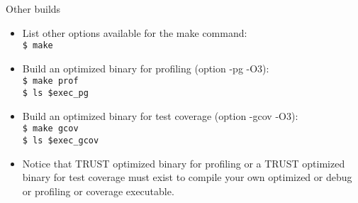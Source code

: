 \documentclass[10pt, hyperref={unicode=true,pdfusetitle, bookmarks=true,bookmarksnumbered=false,bookmarksopen=false, breaklinks=false,pdfborder={0 0 1},backref=true,colorlinks=true,linkcolor=darkblue,pageanchor, urlcolor=darkblue}]{beamer}
\begin{document}
\begin{frame}
\frametitle{}
\begin{block}{Other builds}

\begin{itemize}
\item List other options available for the make command:\\
\texttt{\$ make}

\item Build an optimized binary for profiling (option -pg -O3):\\
\texttt{\$ make prof}\\
\texttt{\$ ls \$exec\_pg}

\item Build an optimized binary for test coverage (option -gcov -O3):\\
\texttt{\$ make gcov}\\
\texttt{\$ ls \$exec\_gcov}\\

\item Notice that TRUST optimized binary for profiling or a TRUST optimized binary for test coverage must exist 
to compile your own optimized or debug or profiling or coverage executable. \\
\end{itemize}

\end{block}
\end{frame}
\end{document}
